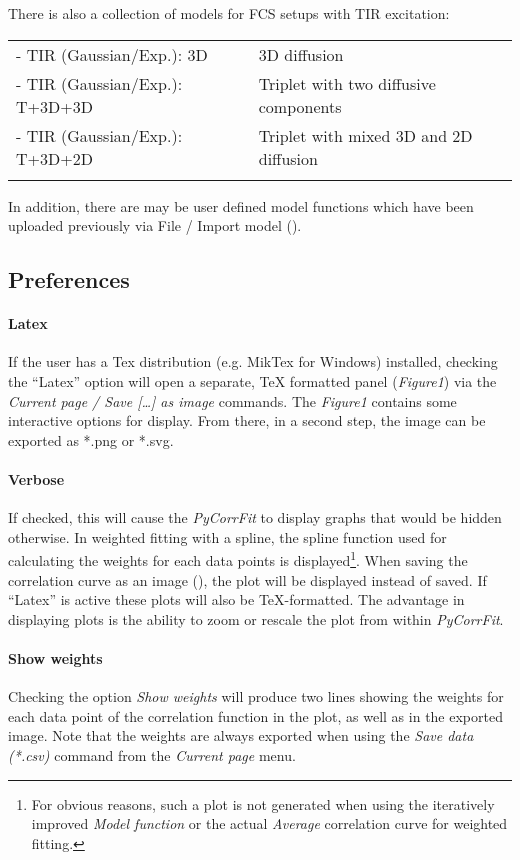 There is also a collection of models for FCS setups with TIR excitation:

\begin{tabular}{l l}
\rule{0pt}{3ex} - TIR (Gaussian/Exp.): 3D & 3D diffusion \\
\rule{0pt}{3ex} - TIR (Gaussian/Exp.): T+3D+3D & Triplet with two diffusive components \\
\rule{0pt}{3ex} - TIR (Gaussian/Exp.): T+3D+2D & Triplet with mixed 3D and 2D diffusion \\
\rule{0pt}{3ex}
\end{tabular}


In addition, there are may be user defined model functions which have been uploaded previously via File / Import model ().

\subsection{Preferences}
\label{sec:model.prefe}
\paragraph*{Latex} If the user has a Tex distribution (e.g. MikTex for Windows) installed, checking the ``Latex'' option will open a separate, TeX formatted panel (\textit{Figure1}) via the \textit{Current page / Save […] as image} commands. The \textit{Figure1} contains some interactive options for display. From there, in a second step, the image can be exported as *.png or *.svg.

\paragraph*{Verbose} If checked, this will cause the \textit{PyCorrFit} to display graphs that would be hidden otherwise. In weighted fitting with a spline, the spline function used for calculating the weights for each data points is displayed\footnote{For obvious reasons, such a plot is not generated when using the iteratively improved \textit{Model function} or the actual \textit{Average} correlation curve for weighted fitting.}. When saving the correlation curve as an image (), the plot will be displayed instead of saved. If ``Latex'' is active these plots will also be TeX-formatted. The advantage in displaying plots is the ability to zoom or rescale the plot from within \textit{PyCorrFit}.

\paragraph*{Show weights}
Checking the option \textit{Show weights} will produce two lines showing the weights for each data point of the correlation function in the plot, as well as in the exported image. Note that the weights are always exported when using the \textit{Save data (*.csv)} command from the \textit{Current page} menu.

